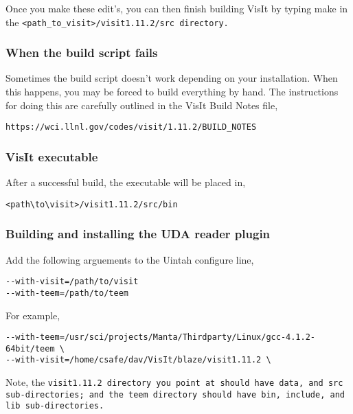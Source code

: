 \normalfont Once you make these edit's, you can then finish building VisIt by typing make in the \tt <path\_to\_visit>/visit1.11.2/src \normalfont directory.  

\subsubsection{When the build script fails}
\label{sec:WhenTheBuildsSriptFails}

Sometimes the build script doesn't work depending on your installation. When this happens, you may be forced to build everything by hand. The instructions for doing this are carefully outlined in the VisIt Build Notes file, 

\begin{Verbatim}[fontsize=\footnotesize]
https://wci.llnl.gov/codes/visit/1.11.2/BUILD_NOTES
\end{Verbatim}

\subsubsection{VisIt executable}
\label{sec:VisItExecutable}

After a successful build, the executable will be placed in,

\begin{Verbatim}[fontsize=\footnotesize]
<path\to\visit>/visit1.11.2/src/bin
\end{Verbatim}

\subsubsection{Building and installing the UDA reader plugin}
\label{sec:BuildingAndInstallingUDAPlugin}

Add the following arguements to the Uintah configure line,

\begin{Verbatim}[fontsize=\footnotesize]
--with-visit=/path/to/visit 
--with-teem=/path/to/teem
\end{Verbatim}

For example,

\begin{Verbatim}[fontsize=\footnotesize]
--with-teem=/usr/sci/projects/Manta/Thirdparty/Linux/gcc-4.1.2-64bit/teem \
--with-visit=/home/csafe/dav/VisIt/blaze/visit1.11.2 \
\end{Verbatim}

Note, the \tt visit1.11.2 \normalfont directory you point at should have \tt data\normalfont , and \tt src \normalfont sub-directories; and the \tt teem \normalfont directory should have \tt bin\normalfont , \tt include\normalfont , and \tt lib \normalfont sub-directories.


